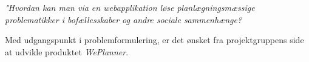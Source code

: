 \begin{center}

\textit{"Hvordan kan man via en webapplikation løse planlægningsmæssige}\\
\textit{problematikker i bofællesskaber og andre sociale sammenhænge?}

\end{center}

\noindent Med udgangspunkt i problemformulering, er det ønsket fra projektgruppens side at udvikle produktet \textit{WePlanner}.